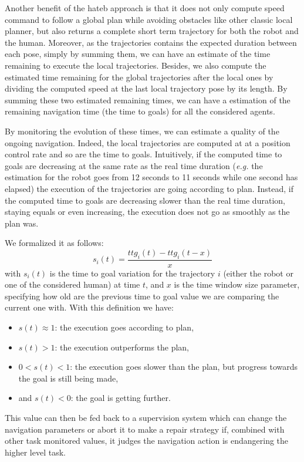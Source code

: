 \documentclass[a4paper,11pt,twoside]{StyleThese}
\begin{document}
Another benefit of the \acrshort{hateb} approach is that it does not only compute speed command to follow a global plan while avoiding obstacles like other classic local planner, but also returns a complete short term trajectory for both the robot and the human. Moreover, as the trajectories contains the expected duration between each pose, simply by summing them, we can have an estimate of the time remaining to execute the local trajectories. Besides, we also compute the estimated time remaining for the global trajectories after the local ones by dividing the computed speed at the last local trajectory pose by its length. By summing these two estimated remaining times, we can have a estimation of the remaining navigation time (the time to goals) for all the considered agents.

By monitoring the evolution of these times, we can estimate a quality of the ongoing navigation. Indeed, the local trajectories are computed at at a position control rate and so are the time to goals. Intuitively, if the computed time to goals are decreasing at the same rate as the real time duration (\textit{e.g.} the estimation for the robot goes from 12 seconds to 11 seconds while one second has elapsed) the execution of the trajectories are going according to plan. Instead, if the computed time to goals are decreasing slower than the real time duration, staying equals or even increasing, the execution does not go as smoothly as the plan was.

We formalized it as follows: 
\begin{equation}
s_i(t) = \frac{ttg_i(t) - ttg_i(t - x)}{x}
\end{equation}
with $s_i(t)$ is the time to goal variation for the trajectory $i$ (either the robot or one of the considered human) at time $t$, and $x$ is the time window size parameter, specifying how old are the previous time to goal value we are comparing the current one with.
With this definition we have:
\begin{itemize}
\item $s(t) \approx 1$: the execution goes according to plan,
\item $s(t) > 1$: the execution outperforms the plan,
\item $0 < s(t) < 1$: the execution goes slower than the plan, but progress towards the goal is still being made,
\item and $s(t) < 0$: the goal is getting further.
\end{itemize}

This value can then be fed back to a supervision system which can change the navigation parameters or abort it to make a repair strategy if, combined with other task monitored values, it judges the navigation action is endangering the higher level task.
\end{document}
